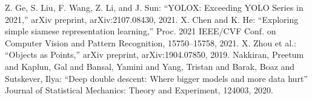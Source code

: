 \documentclass[a4j]{ujarticle}
\begin{document}
    \begin{thebibliography}{9}
         Z. Ge, S. Liu, F. Wang, Z. Li, and J. Sun: ``YOLOX: Exceeding YOLO Series in 2021,'' arXiv preprint, arXiv:2107.08430, 2021.
         X. Chen and K. He: ``Exploring simple siamese representation learning,'' Proc. 2021 IEEE/CVF Conf. on Computer Vision and Pattern Recognition, 15750--15758, 2021.
         X. Zhou et al.: ``Objects as Points,'' arXiv preprint, arXiv:1904.07850, 2019.
         Nakkiran, Preetum and Kaplun, Gal and Bansal, Yamini and Yang, Tristan and Barak, Boaz and Sutskever, Ilya: ``Deep double descent: Where bigger models and more data hurt'' Journal of Statistical Mechanics: Theory and Experiment, 124003, 2020.
    \end{thebibliography}
\end{document}
